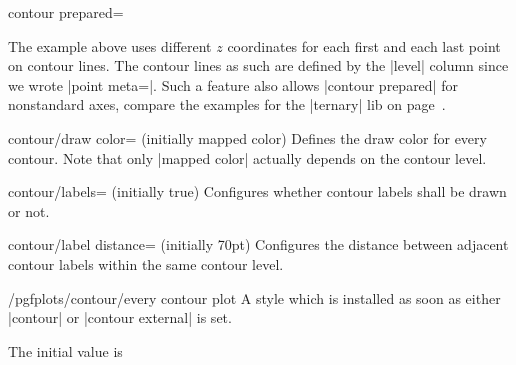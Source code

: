 {{\begin{plottype}[/pgfplots]{contour prepared=\textcolor{black}{}}
\begin{codeexample}[]
\end{codeexample}
    \noindent The example above uses different $z$ coordinates for each first
    and each last point on contour lines. The contour lines as such are defined
    by the |level| column since we wrote |point meta=|. Such a
    feature also allows |contour prepared| for nonstandard axes, compare the
    examples for the |ternary| lib on page~\pageref{page:ternary:contour}.

    \begin{pgfplotskey}{contour/draw color= (initially mapped color)}
        Defines the draw color for every contour. Note that only |mapped color|
        actually depends on the contour level.
    \end{pgfplotskey}

    \begin{pgfplotskey}{contour/labels= (initially true)}
        Configures whether contour labels shall be drawn or not.
    \end{pgfplotskey}

    \begin{pgfplotskey}{contour/label distance= (initially 70pt)}
        Configures the distance between adjacent contour labels within the same
        contour level.
    \end{pgfplotskey}

    \begin{stylekey}{/pgfplots/contour/every contour plot}
        A style which is installed as soon as either |contour| or
        |contour external| is set.

        The initial value is
\begin{codeexample}
\end{codeexample}
    \end{stylekey}


\end{plottype}}}
